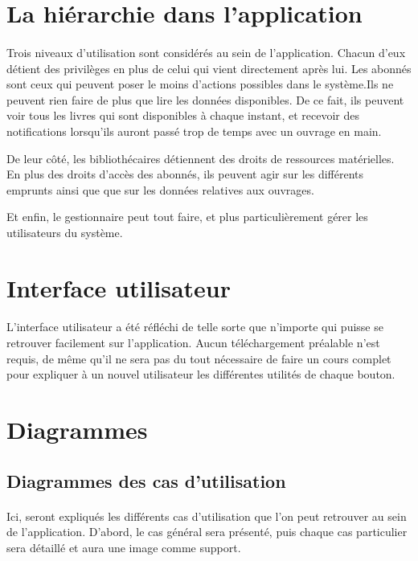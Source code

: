 \section{La hiérarchie dans l'application}
\paragraph{}
Trois niveaux d'utilisation sont considérés au sein de l'application.
Chacun d'eux détient des privilèges en plus de celui qui vient directement après lui.
Les abonnés sont ceux qui peuvent poser le moins d'actions possibles dans le système.Ils 
ne peuvent rien faire de plus que lire les données disponibles. De ce fait, 
ils peuvent voir tous les livres qui sont disponibles à chaque instant, et recevoir 
des notifications lorsqu'ils auront passé trop de temps avec un ouvrage en main.\par 
De leur côté, les bibliothécaires détiennent des droits de ressources matérielles. En plus
des droits d'accès des abonnés, ils peuvent agir sur les différents 
emprunts ainsi que que sur les données relatives aux ouvrages. \par 
Et enfin, le gestionnaire peut tout faire, et plus particulièrement gérer les 
utilisateurs du système.
\section{Interface utilisateur}
\paragraph{}       
L'interface utilisateur a été réfléchi de telle sorte que n'importe qui puisse se retrouver 
facilement sur l'application. Aucun téléchargement préalable n'est requis, de même qu'il 
ne sera pas du tout nécessaire de faire un cours complet pour expliquer à un nouvel 
utilisateur les différentes utilités de chaque bouton.

\section{Diagrammes}
\subsection{Diagrammes des cas d'utilisation}
\paragraph{}
Ici, seront expliqués les différents cas d'utilisation que l'on peut retrouver au sein de 
l'application. D'abord, le cas général sera présenté, puis chaque cas particulier sera 
détaillé et aura une image comme support.
